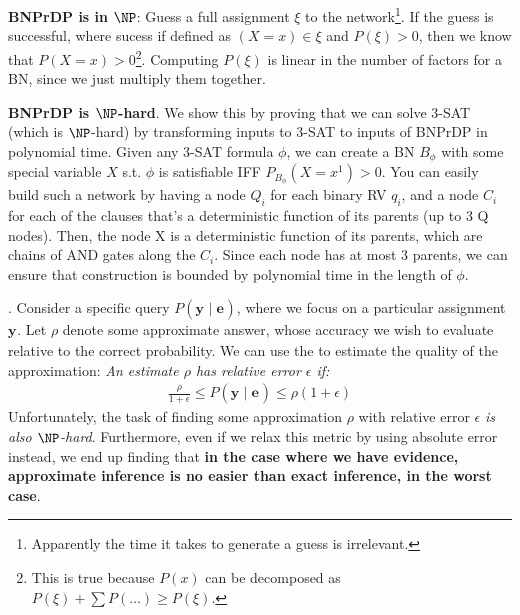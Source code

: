 \documentclass[11pt]{article}
\renewcommand\vec[2][]{\bm{#2}_{#1}}
\newcommand\myspace[1][]{\vspace{#1\bigskipamount}}
\newcommand\p{\Needspace{10\baselineskip} \noindent}
\begin{document}
\begin{footnotesize}
	\begin{compactenum}
		\item \textbf{BNPrDP is in $\NP$}: Guess a full assignment $\xi$ to the network\footnote{Apparently the time it takes to generate a guess is irrelevant.}. If the guess is successful, where sucess if defined as $(X=x) \in \xi$ and $P(\xi) > 0$, then we know that $P(X=x) > 0$\footnote{This is true because $P(x)$ can be decomposed as $P(\xi) + \sum P(\ldots) \ge P(\xi)$.}. Computing $P(\xi)$ is linear in the number of factors for a BN, since we just multiply them together.
		
		\item \textbf{BNPrDP is $\NP$-hard}. We show this by proving that we can solve 3-SAT (which is $\NP$-hard) by transforming inputs to 3-SAT to inputs of BNPrDP in polynomial time. Given any 3-SAT formula $\phi$, we can create a BN $B_{\phi}$ with some special variable $X$ s.t. $\phi$ is satisfiable IFF $P_{B_{\phi}}(X = x^1) > 0$. You can easily build such a network by having a node $Q_i$ for each binary RV $q_i$, and a node $C_i$ for each of the clauses that's a deterministic function of its parents (up to 3 Q nodes). Then, the node X is a deterministic function of its parents, which are chains of AND gates along the $C_i$. Since each node has at most 3 parents, we can ensure that construction is bounded by polynomial time in the length of $\phi$. 
	\end{compactenum}
\end{footnotesize}

\myspace
\p {}. Consider a specific query $P(\vec y \mid \vec e)$, where we focus on a particular assignment $\vec y$. Let $\rho$ denote some approximate answer, whose accuracy we wish to evaluate relative to the correct probability. We can use the  to estimate the quality of the approximation: \textit{An estimate $\rho$ has relative error $\epsilon$ if:}
\begin{align}
	\frac{\rho}{1 + \epsilon} \le P(\vec y \mid \vec e) \le \rho (1 + \epsilon)
\end{align}
Unfortunately, the task of finding some approximation $\rho$ with relative error $\epsilon$ \textit{is also $\NP$-hard}. Furthermore, even if we relax this metric by using absolute error instead, we end up finding that \textbf{in the case where we have evidence, approximate inference is no easier than exact inference, in the worst case}.
\end{document}
